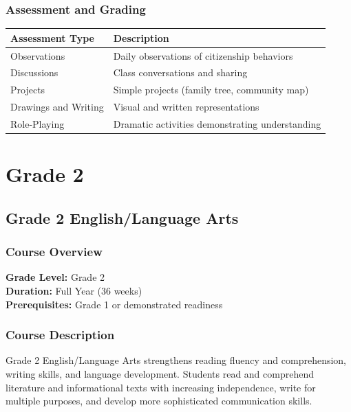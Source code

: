 \documentclass[11pt,letterpaper]{report}
\begin{document}
\section{Assessment and Grading}

\begin{center}
\begin{tabular}{|l|l|}
\hline
\textbf{Assessment Type} & \textbf{Description} \\
\hline
Observations & Daily observations of citizenship behaviors \\
\hline
Discussions & Class conversations and sharing \\
\hline
Projects & Simple projects (family tree, community map) \\
\hline
Drawings and Writing & Visual and written representations \\
\hline
Role-Playing & Dramatic activities demonstrating understanding \\
\hline
\end{tabular}
\end{center}


\clearpage

\part{Grade 2}

\chapter{Grade 2 English/Language Arts}

\section{Course Overview}

\textbf{Grade Level:} Grade 2\\
\textbf{Duration:} Full Year (36 weeks)\\
\textbf{Prerequisites:} Grade 1 or demonstrated readiness

\section{Course Description}

Grade 2 English/Language Arts strengthens reading fluency and comprehension, writing skills, and language development. Students read and comprehend literature and informational texts with increasing independence, write for multiple purposes, and develop more sophisticated communication skills.
\end{document}

